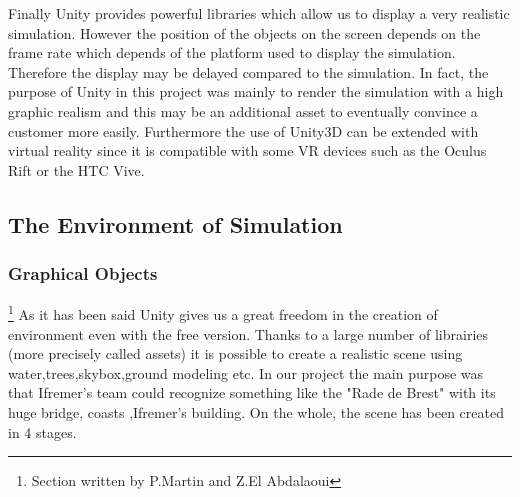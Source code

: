 \documentclass[a4paper]{report}
\begin{document}
Finally Unity provides powerful libraries which allow us to display a very realistic simulation. However the position of the objects on the screen depends on the frame rate which depends of the platform used to display the simulation. Therefore the display may be delayed compared to the simulation. In fact, the purpose of Unity in this project was mainly to render the simulation with a high graphic realism and this may be an additional asset to eventually convince a customer more easily. Furthermore the use of Unity3D can be extended with virtual reality since it is compatible with some VR devices such as the Oculus Rift or the HTC Vive. 

\subsection{The Environment of Simulation}
\subsubsection{Graphical Objects}
\footnote{Section written by P.Martin and Z.El Abdalaoui}
As it has been said Unity gives us a great freedom in the creation of environment even with the free version. Thanks to a large number of librairies (more precisely called assets) it is possible to create a realistic scene using water,trees,skybox,ground modeling etc.
In our project the main purpose was that Ifremer's team could recognize something like the "Rade de Brest" with its huge bridge, coasts ,Ifremer's building. On the whole, the scene has been created in 4 stages.
\end{document}
